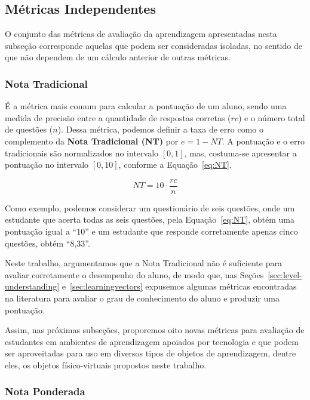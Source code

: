 \subsection{Métricas Independentes}
O conjunto das métricas de avaliação da aprendizagem apresentadas nesta subseção corresponde aquelas que podem ser consideradas isoladas, no sentido de que não dependem de um cálculo anterior de outras métricas. 

\subsubsection{Nota Tradicional}\label{sec:nota-tradicional}

É a métrica mais comum para calcular a pontuação de um aluno, sendo uma medida de precisão entre a quantidade de respostas corretas ($rc$) e o número total de questões ($n$). Dessa métrica, podemos definir a taxa de erro como o complemento da \textbf{Nota Tradicional (NT)} por $e=1-NT$. A pontuação e o erro tradicionais são normalizados no intervalo $[0,1]$, mas, costuma-se apresentar a pontuação no intervalo $[0,10]$, conforme a Equação~\ref{eq:NT}.

\begin{equation}\label{eq:NT}
NT=10\cdot \frac{rc}{n}
\end{equation}

Como exemplo, podemos considerar um questionário de seis questões, onde um estudante que acerta todas as seis questões, pela Equação~\ref{eq:NT}, obtém uma pontuação igual a ``10'' e um estudante que responde corretamente apenas cinco questões, obtém ``8,33''.

Neste trabalho, argumentamos que a Nota Tradicional não é suficiente para avaliar corretamente o desempenho do aluno, de modo que, nas Seções~\ref{sec:level-understanding} e~\ref{sec:learningvectors} expusemos algumas métricas encontradas na literatura para avaliar o grau de conhecimento do aluno e produzir uma pontuação.

Assim, nas próximas subseções, proporemos oito novas métricas para avaliação de estudantes em ambientes de aprendizagem apoiados por tecnologia e que podem ser aproveitadas para uso em diversos tipos de objetos de aprendizagem, dentre eles, os objetos físico-virtuais propostos neste trabalho.

\subsubsection{Nota Ponderada}\label{sec:nota-ponderada}

